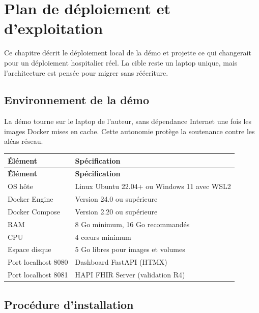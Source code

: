 \chapter{Plan de déploiement et d'exploitation}
\label{ch:deploiement}

Ce chapitre décrit le déploiement local de la démo et projette ce qui changerait pour un déploiement hospitalier réel. La cible reste un laptop unique, mais l'architecture est pensée pour migrer sans réécriture.

\section{Environnement de la démo}
\label{sec:deploiement-environnement}

La démo tourne sur le laptop de l'auteur, sans dépendance Internet une fois les images Docker mises en cache. Cette autonomie protège la soutenance contre les aléas réseau.

\bridgezebra
\begin{longtable}{p{5cm}p{9cm}}
  \toprule
  \rowcolor{bridgeblue!90}
  {\color{white}\bfseries Élément} & {\color{white}\bfseries Spécification} \\
  \midrule
  \endfirsthead
  \toprule
  \rowcolor{bridgeblue!90}
  {\color{white}\bfseries Élément} & {\color{white}\bfseries Spécification} \\
  \midrule
  \endhead
  \bottomrule
  \endfoot
  OS hôte                & Linux Ubuntu 22.04+ ou Windows 11 avec WSL2 \\
  Docker Engine          & Version 24.0 ou supérieure \\
  Docker Compose         & Version 2.20 ou supérieure \\
  RAM                    & 8 Go minimum, 16 Go recommandés \\
  CPU                    & 4 cœurs minimum \\
  Espace disque          & 5 Go libres pour images et volumes \\
  Port localhost 8080    & Dashboard FastAPI (HTMX) \\
  Port localhost 8081    & HAPI FHIR Server (validation R4) \\
\end{longtable}

\section{Procédure d'installation}
\label{sec:deploiement-installation}

